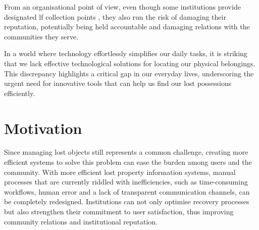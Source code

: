 From an organisational point of view, even though some institutions provide designated \ac{lf} collection points \cite{Tan2023}, they also run the risk of damaging their reputation, potentially being held accountable and damaging relations with the communities they serve.

In a world where technology effortlessly simplifies our daily tasks, it is striking that we lack effective technological solutions for locating our physical belongings. This discrepancy highlights a critical gap in our everyday lives, underscoring the urgent need for innovative tools that can help us find our lost possessions efficiently.

\section{Motivation} \label{section:motivation}

Since managing lost objects still represents a common challenge, creating more efficient systems to solve this problem can ease the burden among users and the community. With more efficient lost property information systems, manual processes that are currently riddled with inefficiencies, such as time-consuming workflows, human error and a lack of transparent communication channels, can be completely redesigned. Institutions can not only optimise recovery processes but also strengthen their commitment to user satisfaction, thus improving community relations and institutional reputation.

